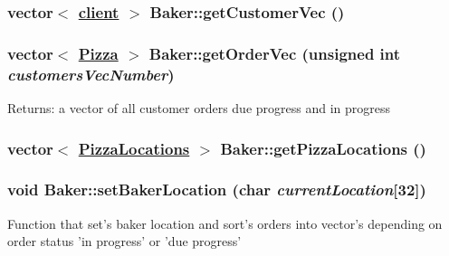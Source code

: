 \hypertarget{class_baker_3970b0afe27b514282442b11592e1602}{
\subsubsection[getCustomerVec]{\setlength{\rightskip}{0pt plus 5cm}vector$<$ \hyperlink{classclient}{client} $>$ Baker::get\-Customer\-Vec ()}}
\label{class_baker_3970b0afe27b514282442b11592e1602}


\hypertarget{class_baker_ad0cbeddec394b25c5eade57247f4110}{
\subsubsection[getOrderVec]{\setlength{\rightskip}{0pt plus 5cm}vector$<$ \hyperlink{class_pizza}{Pizza} $>$ Baker::get\-Order\-Vec (unsigned int {\em customers\-Vec\-Number})}}
\label{class_baker_ad0cbeddec394b25c5eade57247f4110}


\begin{Desc}
\item[Returns:]a vector of all customer orders due progress and in progress \end{Desc}
\hypertarget{class_baker_3d38e7498fba59674c7d3838bf4c1824}{
\subsubsection[getPizzaLocations]{\setlength{\rightskip}{0pt plus 5cm}vector$<$ \hyperlink{class_pizza_locations}{Pizza\-Locations} $>$ Baker::get\-Pizza\-Locations ()}}
\label{class_baker_3d38e7498fba59674c7d3838bf4c1824}


\hypertarget{class_baker_b85151ecb20282d81b4dab489fea7dd8}{
\subsubsection[setBakerLocation]{\setlength{\rightskip}{0pt plus 5cm}void Baker::set\-Baker\-Location (char {\em current\-Location}\mbox{[}32\mbox{]})}}
\label{class_baker_b85151ecb20282d81b4dab489fea7dd8}


Function that set's baker location and sort's orders into vector's depending on order status 'in progress' or 'due progress'

